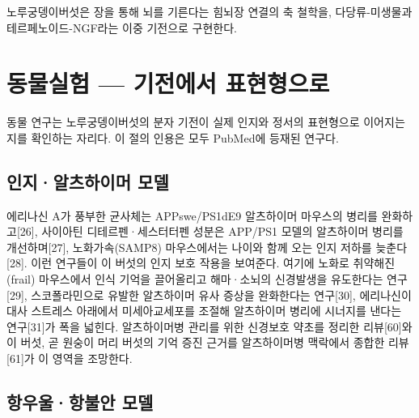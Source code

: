 \documentclass[12pt,oneside]{book}
\begin{document}
\vspace{2pt}\vspace{3pt}

노루궁뎅이버섯은 장을 통해 뇌를 기른다는 힘뇌장 연결의 축 철학을, 다당류-미생물과 테르페노이드-NGF라는 이중 기전으로 구현한다.

\section{동물실험 — 기전에서 표현형으로}

동물 연구는 노루궁뎅이버섯의 분자 기전이 실제 인지와 정서의 표현형으로 이어지는지를 확인하는 자리다. 이 절의 인용은 모두 PubMed에 등재된 연구다.

\subsection{인지·알츠하이머 모델}

에리나신 A가 풍부한 균사체는 APPswe/PS1dE9 알츠하이머 마우스의 병리를 완화하고[26], 사이아틴 디테르펜·세스터터펜 성분은 APP/PS1 모델의 알츠하이머 병리를 개선하며[27], 노화가속(SAMP8) 마우스에서는 나이와 함께 오는 인지 저하를 늦춘다[28]. 이런 연구들이 이 버섯의 인지 보호 작용을 보여준다. 여기에 노화로 취약해진(frail) 마우스에서 인식 기억을 끌어올리고 해마·소뇌의 신경발생을 유도한다는 연구[29], 스코폴라민으로 유발한 알츠하이머 유사 증상을 완화한다는 연구[30], 에리나신이 대사 스트레스 아래에서 미세아교세포를 조절해 알츠하이머 병리에 시너지를 낸다는 연구[31]가 폭을 넓힌다. 알츠하이머병 관리를 위한 신경보호 약초를 정리한 리뷰[60]와 이 버섯, 곧 원숭이 머리 버섯의 기억 증진 근거를 알츠하이머병 맥락에서 종합한 리뷰[61]가 이 영역을 조망한다.

\subsection{항우울·항불안 모델}
\end{document}

